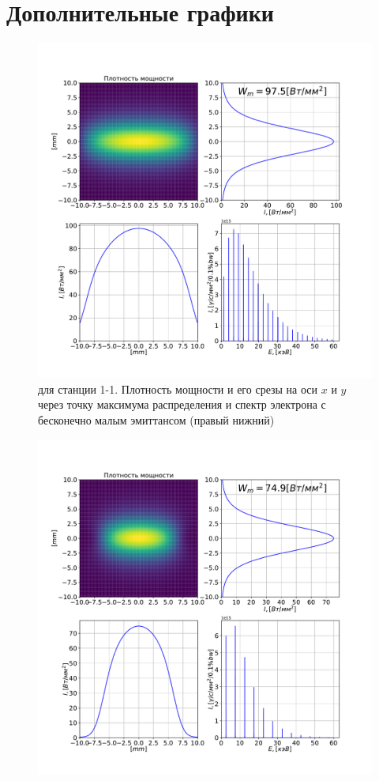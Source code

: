 \chapter{Дополнительные графики} \label{AppendixA}
\begin{figure}[h!]
	\centering  
	\includegraphics[width=\textwidth]{pic/power_dens_1-1.pdf}
	\caption{для станции 1-1. Плотность мощности  и его срезы на оси $x$ и $y$ через точку максимума распределения и спектр электрона с бесконечно малым эмиттансом (правый нижний)}
	\label{fig:power_dens_1-1}  
\end{figure}\begin{figure}[h!]
	\centering  
	\includegraphics[width=\textwidth]{pic/power_dens_1-2.pdf}

\end{figure}
